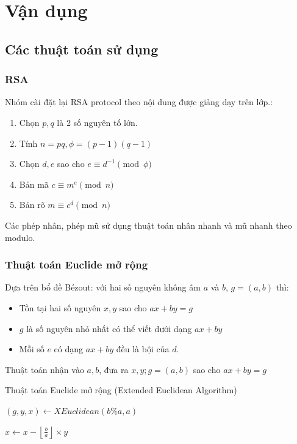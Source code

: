 \documentclass[12pt]{article}
\begin{document}
\section{Vận dụng}
\subsection{Các thuật toán sử dụng}
\subsubsection{RSA}
Nhóm cài đặt lại RSA protocol theo nội dung được giảng dạy trên lớp.:
\begin{enumerate}
\item Chọn $p, q$ là 2 số nguyên tố lớn.
\item Tính $n = pq, \phi = (p - 1)(q - 1)$
\item Chọn $d, e$ sao cho $e \equiv d^{-1} \pmod \phi$
\item Bản mã $c \equiv m^e \pmod n$
\item Bản rõ $m \equiv c^d \pmod n$
\end{enumerate}
Các phép nhân, phép mũ sử dụng thuật toán nhân nhanh và mũ nhanh theo modulo.
\subsubsection{Thuật toán Euclide mở rộng}
Dựa trên bổ đề Bézout: với hai số nguyên không âm $a$ và $b$, $g = (a, b)$ thì:
\begin{itemize}
\item Tồn tại hai số nguyên $x, y$ sao cho $ax + by = g$
\item $g$ là số nguyên nhỏ nhất có thể viết dưới dạng $ax + by$
\item Mỗi số $e$ có dạng $ax + by$ đều là bội của $d$.
\end{itemize}
Thuật toán nhận vào $a, b$, đưa ra $x, y; g = (a, b)$ sao cho $ax + by = g$
\begin{algorithm}[H]
\caption{Thuật toán Euclide mở rộng (Extended Euclidean Algorithm)}
\begin{algorithmic}
\Else
\State $(g, y, x) \gets XEuclidean(b \% a, a)$

\State $\displaystyle x \gets x - \left\lfloor\frac{b}{a}\right\rfloor \times y$

\EndIf
\EndFunction
\end{algorithmic}
\end{algorithm}
\end{document}
